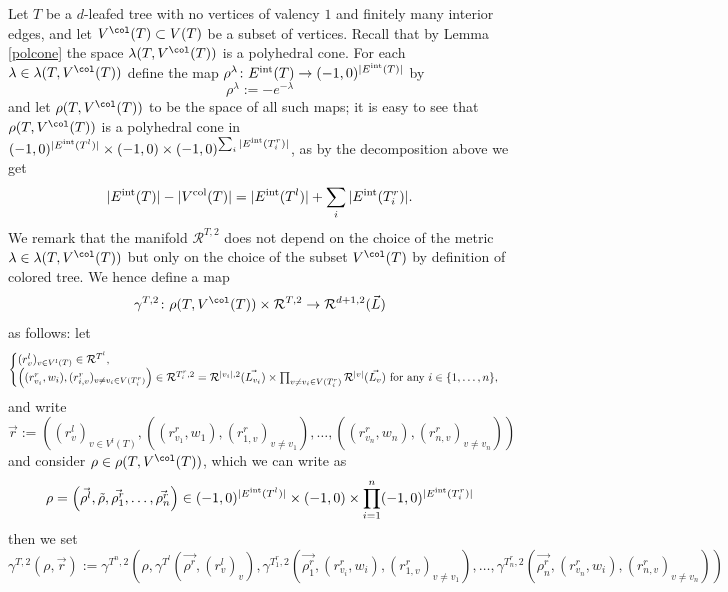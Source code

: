 	Let $T$ be a $d$-leafed tree with no vertices of valency $1$ and finitely many interior edges, and let $V^\col(T)\subset V(T)$ be a subset of vertices. Recall that by Lemma \ref{polcone} the space $\lambda(T,V^\col(T))$ is a polyhedral cone. For each $\lambda\in \lambda(T,V^\col(T))$ define the map $\rho^\lambda\colon E^\textnormal{int}(T)\rightarrow (-1,0)^{|E^\textnormal{int}(T)|}$ by $$\rho^\lambda:= -e^{-\lambda}$$ and let $\rho(T,V^\col(T))$ to be the space of all such maps; it is easy to see that $\rho(T, V^\col(T))$ is a polyhedral cone in $(-1,0)^{|E^\textnormal{int}(T^l)|}\times (-1,0)\times (-1,0)^{\sum_i|E^\textnormal{int}(T^r_i)|}$, as by the decomposition above we get $$|E^\textnormal{int}(T)|-|V^\textnormal{col}(T)| = |E^\textnormal{int}(T^l)|+\sum_i|E^\textnormal{int}(T^r_i)|.$$
	We remark that the manifold $\mathcal{R}^{T,2}$ does not depend on the choice of the metric $\lambda\in \lambda(T,V^\col(T))$ but only on the choice of the subset $V^\col(T)$ by definition of colored tree. We hence define a map $$\gamma^{T,2}\colon\rho(T,V^\col(T))\times \mathcal{R}^{T,2}\to \mathcal{R}^{d+1,2}(\vec{L})$$ as follows: let $$\begin{cases}
		(r^l_v)_{v\in V^l(T)}\in \mathcal{R}^{T^l},\\
		\left((r^r_{v_i},w_i),(r^r_{i,v})_{v\neq v_i\in V(T^r_i)}\right)\in \mathcal{R}^{T^r_i,2}= \mathcal{R}^{|v_i|,2}(\vec{L_{v_i}})\times \prod_{v\neq v_i\in V(T_i^r)}\mathcal{R}^{|v|}(\vec{L_v}) \textnormal{  for any }i\in \{1,\ldots, n\},
	\end{cases}$$
	and write $$\vec{r}:=\left( (r^l_v)_{v\in V^l(T)},  \left((r^r_{v_1},w_1),(r^r_{1,v})_{v\neq v_1}\right),\ldots, \left((r^r_{v_n},w_n),(r^r_{n,v})_{v\neq v_n}\right)\right)$$
	and consider $\rho\in \rho(T,V^\col(T))$, which we can write as $$\rho = \left(\vec{\rho^l}, \tilde{\rho}, \vec{\rho_{1}^r},\ldots, \vec{\rho_n^r}\right)\in  (-1,0)^{|E^\textnormal{int}(T^l)|}\times (-1,0)\times \prod_{i=1}^n(-1,0)^{|E^\textnormal{int}(T^r_{i})|}$$
	then we set $$\gamma^{T,2}(\rho, \vec{r}):=\gamma^{T^n,2}\left(\rho, \gamma^{T^l}(\vec{\rho^r}, (r^l_v)_v), \gamma^{T_1^r,2}(\vec{\rho^r_1}, (r^r_{v_i},w_i),(r^r_{1,v})_{v\neq v_1}), \ldots, \gamma^{T_n^r,2}(\vec{\rho^r_n}, (r^r_{v_n},w_i),(r^r_{n,v})_{v\neq v_n})\right)$$
	
